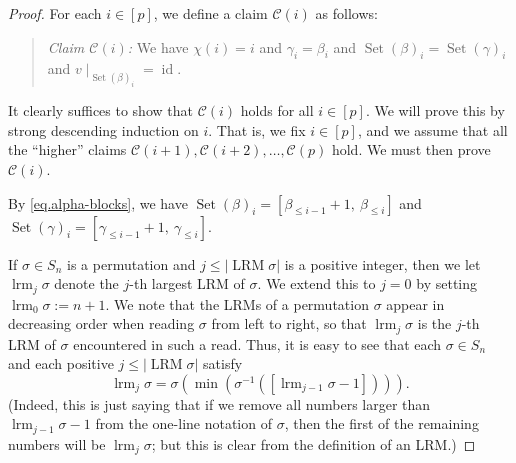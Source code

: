 \documentclass[10pt,a4paper]{amsart}
\newcommand{\Set}{\operatorname{Set}}
\newcommand{\id}{\operatorname{id}} %
\newcommand{\tup}[1]{\left( #1 \right)}
\begin{document}
\begin{proof}
For each $i\in\left[  p\right]  $, we define a claim $\mathcal{C}\tup{i}$
as follows:
\begin{quote}
\textit{Claim $\mathcal{C}\tup{i}$:}
We have $\chi\tup{i} = i$
and $\gamma_i = \beta_i$
and $\Set\tup{\beta}_i = \Set\tup{\gamma}_i$
and $\left. v\mid_{\Set\tup{\beta}_i} \right. = \id$.
\end{quote}
It clearly suffices to show that $\mathcal{C}\left(  i\right)  $ holds for all
$i\in\left[  p\right]  $. We will prove this by strong descending induction
on $i$. That is, we fix $i\in\left[  p\right]  $, and we assume that
all the ``higher'' claims
$\mathcal{C}\left(  i+1\right)  ,\mathcal{C}\left(  i+2\right)  ,\ldots
,\mathcal{C}\left(  p\right)  $ hold. We must then prove $\mathcal{C}\left(
i\right)  $.

By \eqref{eq.alpha-blocks},
we have $\operatorname*{Set}\left(
\beta\right)  _{i}=\left[  \beta_{\leq i-1}+1,\ \beta_{\leq i}\right]  $
and $\operatorname*{Set}\left(  \gamma\right)  _{i}=\left[
\gamma_{\leq i-1}+1,\ \gamma_{\leq i}\right]  $.

If $\sigma\in S_{n}$ is a permutation and $j\leq\left\vert \operatorname*{LRM}%
\sigma\right\vert $ is a positive integer, then we let $\operatorname*{lrm}%
\nolimits_{j}\sigma$ denote the $j$-th largest LRM of $\sigma$. We extend this
to $j=0$ by setting $\operatorname*{lrm}\nolimits_{0}\sigma:=n+1$. We note
that the LRMs of a permutation $\sigma$ appear in decreasing order when
reading $\sigma$ from left to right, so that $\operatorname*{lrm}%
\nolimits_{j}\sigma$ is the $j$-th LRM of $\sigma$ encountered in such a read.
Thus, it is easy to see that each $\sigma\in S_{n}$ and each positive
$j\leq\left\vert \operatorname*{LRM}\sigma\right\vert $ satisfy%
\begin{equation}
\operatorname*{lrm}\nolimits_{j}\sigma=\sigma\left(  \min\left(  \sigma
^{-1}\left(  \left[  \operatorname*{lrm}\nolimits_{j-1}\sigma-1\right]
\right)  \right)  \right)  .\label{pf.lem.wuv.lrm-min}%
\end{equation}
(Indeed, this is just saying that if we remove all numbers larger than
$\operatorname*{lrm}\nolimits_{j-1}\sigma-1$ from the one-line notation of
$\sigma$, then the first of the remaining numbers will be $\operatorname*{lrm}%
\nolimits_{j}\sigma$; but this is clear from the definition of an LRM.)


\end{proof}
\end{document}
